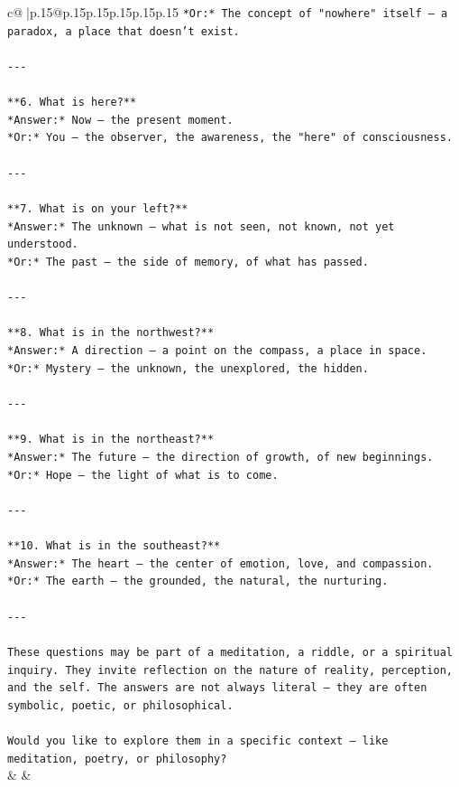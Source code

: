 \documentclass{article}
\begin{document}
{\begin{supertabular}{c@{$\;$}|p{.15\linewidth}@{}p{.15\linewidth}p{.15\linewidth}p{.15\linewidth}p{.15\linewidth}p{.15\linewidth}}
{{{\texttt{*Or:* The concept of "nowhere" itself — a paradox, a place that doesn't exist.} \\
\\ 
\texttt{{-}{-}{-}} \\
\\ 
\texttt{**6. What is here?**  } \\
\texttt{*Answer:* Now — the present moment.  } \\
\texttt{*Or:* You — the observer, the awareness, the "here" of consciousness.} \\
\\ 
\texttt{{-}{-}{-}} \\
\\ 
\texttt{**7. What is on your left?**  } \\
\texttt{*Answer:* The unknown — what is not seen, not known, not yet understood.  } \\
\texttt{*Or:* The past — the side of memory, of what has passed.} \\
\\ 
\texttt{{-}{-}{-}} \\
\\ 
\texttt{**8. What is in the northwest?**  } \\
\texttt{*Answer:* A direction — a point on the compass, a place in space.  } \\
\texttt{*Or:* Mystery — the unknown, the unexplored, the hidden.} \\
\\ 
\texttt{{-}{-}{-}} \\
\\ 
\texttt{**9. What is in the northeast?**  } \\
\texttt{*Answer:* The future — the direction of growth, of new beginnings.  } \\
\texttt{*Or:* Hope — the light of what is to come.} \\
\\ 
\texttt{{-}{-}{-}} \\
\\ 
\texttt{**10. What is in the southeast?**  } \\
\texttt{*Answer:* The heart — the center of emotion, love, and compassion.  } \\
\texttt{*Or:* The earth — the grounded, the natural, the nurturing.} \\
\\ 
\texttt{{-}{-}{-}} \\
\\ 
\texttt{These questions may be part of a meditation, a riddle, or a spiritual inquiry. They invite reflection on the nature of reality, perception, and the self. The answers are not always literal — they are often symbolic, poetic, or philosophical.} \\
\\ 
\texttt{Would you like to explore them in a specific context — like meditation, poetry, or philosophy?} \\
            }
        }
    }
    & & \\ \\


\end{supertabular}}
\end{document}
